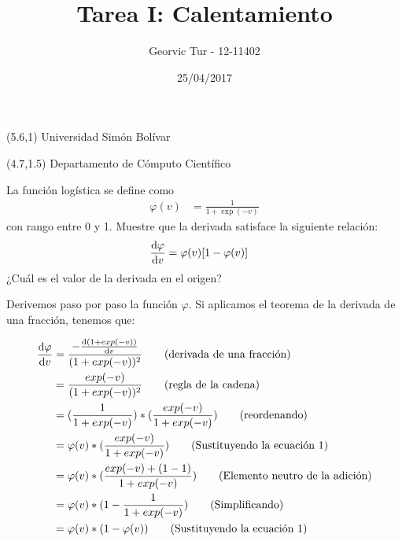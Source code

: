 \documentclass[11pt,spanish,answers]{exam}
\title{Tarea I: Calentamiento}
\author{Georvic Tur - 12-11402}
\date{25/04/2017}
\begin{document}
\begin{textblock}{10}(5.6,1)
    \noindent\LARGE Universidad Simón Bolívar
\end{textblock}

\begin{textblock}{10}(4.7,1.5)
    \noindent\LARGE Departamento de Cómputo Científico
\end{textblock}

\maketitle

\renewcommand{\solutiontitle}{\noindent\textbf{Solución:}\par\noindent}

\begin{questions}

\question
La función logística se define como 
\begin{equation} \label{eq1}
    \begin{split}
        \varphi(v) & = \frac{1}{1 + \exp(-v)}
    \end{split}
\end{equation}
con rango entre 0 y 1. Muestre que la derivada satisface la siguiente relación:
\begin{equation} \label{eq2}
    \begin{split}
        \dv{\varphi}{v} & = \varphi(v)[1-\varphi(v)]
    \end{split}
\end{equation}
¿Cuál es el valor de la derivada en el origen?

    \begin{solution}
    
        Derivemos paso por paso la función $\varphi$. Si aplicamos el teorema de la derivada de una fracción, tenemos que:
        
        \begin{align*}
           \dv{\varphi}{v} &=  \frac{- \dv{(1+exp(-v))}{v}}{(1+exp(-v))^2} \tag*{(derivada de una fracción)} \\
           &= \frac{exp(-v)}{(1+exp(-v))^2}           \tag*{(regla de la cadena)} \\
           &= (\frac{1}{1+exp(-v)})*(\frac{exp(-v)}{1+exp(-v)})           \tag*{(reordenando)} \\
           &= \varphi(v)*(\frac{exp(-v)}{1+exp(-v)})           \tag*{(Sustituyendo la ecuación 1)} \\
           &= \varphi(v)*(\frac{exp(-v)+(1-1)}{1+exp(-v)})           \tag*{(Elemento neutro de la adición)} \\
           &= \varphi(v)*(1 - \frac{1}{1+exp(-v)})           \tag*{(Simplificando)} \\
           &= \varphi(v)*(1 - \varphi(v))           \tag*{(Sustituyendo la ecuación 1)} \\
        \end{align*}
        

\end{solution}
\end{questions}
\end{document}
